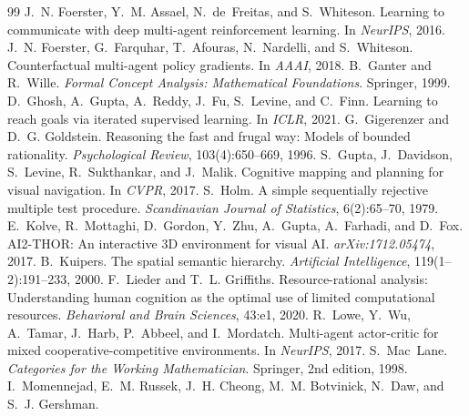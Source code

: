 \documentclass{article}
\begin{document}
\begin{thebibliography}{99}
J.~N. Foerster, Y.~M. Assael, N.~de~Freitas, and S.~Whiteson.
\newblock Learning to communicate with deep multi-agent reinforcement learning.
\newblock In \emph{NeurIPS}, 2016.
J.~N. Foerster, G.~Farquhar, T.~Afouras, N.~Nardelli, and S.~Whiteson.
\newblock Counterfactual multi-agent policy gradients.
\newblock In \emph{AAAI}, 2018.
B.~Ganter and R.~Wille.
\newblock \emph{Formal Concept Analysis: Mathematical Foundations}.
\newblock Springer, 1999.
D.~Ghosh, A.~Gupta, A.~Reddy, J.~Fu, S.~Levine, and C.~Finn.
\newblock Learning to reach goals via iterated supervised learning.
\newblock In \emph{ICLR}, 2021.
G.~Gigerenzer and D.~G. Goldstein.
\newblock Reasoning the fast and frugal way: Models of bounded rationality.
\newblock \emph{Psychological Review}, 103(4):650--669, 1996.
S.~Gupta, J.~Davidson, S.~Levine, R.~Sukthankar, and J.~Malik.
\newblock Cognitive mapping and planning for visual navigation.
\newblock In \emph{CVPR}, 2017.
S.~Holm.
\newblock A simple sequentially rejective multiple test procedure.
\newblock \emph{Scandinavian Journal of Statistics}, 6(2):65--70, 1979.
E.~Kolve, R.~Mottaghi, D.~Gordon, Y.~Zhu, A.~Gupta, A.~Farhadi, and D.~Fox.
\newblock AI2-THOR: An interactive 3D environment for visual AI.
\newblock \emph{arXiv:1712.05474}, 2017.
B.~Kuipers.
\newblock The spatial semantic hierarchy.
\newblock \emph{Artificial Intelligence}, 119(1--2):191--233, 2000.
F.~Lieder and T.~L. Griffiths.
\newblock Resource-rational analysis: Understanding human cognition as the optimal use of limited computational resources.
\newblock \emph{Behavioral and Brain Sciences}, 43:e1, 2020.
R.~Lowe, Y.~Wu, A.~Tamar, J.~Harb, P.~Abbeel, and I.~Mordatch.
\newblock Multi-agent actor-critic for mixed cooperative-competitive environments.
\newblock In \emph{NeurIPS}, 2017.
S.~Mac~Lane.
\newblock \emph{Categories for the Working Mathematician}.
\newblock Springer, 2nd edition, 1998.
I.~Momennejad, E.~M. Russek, J.~H. Cheong, M.~M. Botvinick, N.~Daw, and S.~J. Gershman.

\end{thebibliography}
\end{document}
